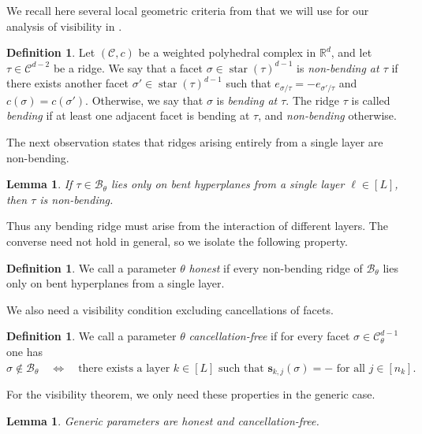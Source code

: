 \documentclass{article}
\newtheorem{lemma}[theorem]{Lemma}
\theoremstyle{definition}
\newtheorem{definition}[theorem]{Definition}
\newcommand{\R}{\mathbb{R}}
\newcommand{\complex}{\mathcal{C}}
\newcommand{\bcomplex}[1]{\mathcal{B}_{#1}}
\newcommand{\str}{\operatorname{star}}
\begin{document}
We recall here several local geometric criteria from  \citet{grillo2026relunetworksadmitidentifiable} that we will use for our analysis of visibility in . 

\begin{definition}
Let $(\complex,c)$ be a weighted polyhedral complex in $\R^d$, and let $\tau \in \complex^{d-2}$ be a ridge.
We say that a facet $\sigma \in \str(\tau)^{d-1}$ is \emph{non-bending at $\tau$} if there exists another
facet $\sigma' \in \str(\tau)^{d-1}$ such that
$
e_{\sigma/\tau}=-e_{\sigma'/\tau}
$ and $
c(\sigma)=c(\sigma').
$
Otherwise, we say that $\sigma$ is \emph{bending at $\tau$}.
The ridge $\tau$ is called \emph{bending} if at least one adjacent facet is bending at $\tau$,
and \emph{non-bending} otherwise.
\end{definition}

The next observation states that ridges arising entirely from a single layer are non-bending.
\begin{lemma}
\label{lem:hyperplaneAimpliesnonbending}
If $\tau \in \bcomplex{\theta}$ lies only on bent hyperplanes from a single layer $\ell \in [L]$,
then $\tau$ is non-bending.
\end{lemma}

Thus any bending ridge must arise from the interaction of different layers. The converse need not hold
in general, so we isolate the following property.

\begin{definition}
We call a parameter $\theta$ \emph{honest} if every non-bending ridge of $\bcomplex{\theta}$ lies only
on bent hyperplanes from a single layer.
\end{definition}

We also need a visibility condition excluding cancellations of facets.

\begin{definition}
We call a parameter $\theta$ \emph{cancellation-free} if for every facet
$\sigma \in \complex_\theta^{d-1}$ one has
$
\sigma \notin \bcomplex{\theta}
\quad\Longleftrightarrow\quad
\text{there exists a layer } k \in [L] \text{ such that } \mathbf{s}_{k,j}(\sigma)=- \text{ for all } j\in[n_k].
$
\end{definition}

For the visibility theorem, we only need these properties in the generic case.

\begin{lemma}


\label{lem:generic_honest}
Generic parameters are honest and cancellation-free.
\end{lemma}
\end{document}
